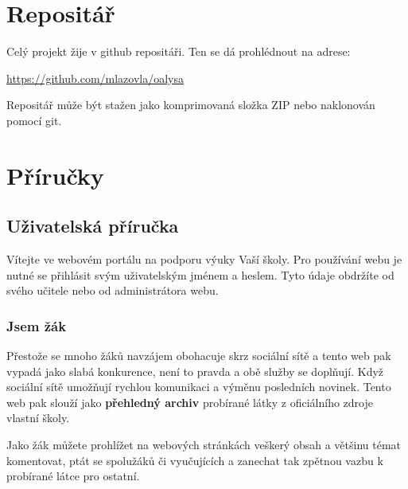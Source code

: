 \documentclass[thesis=B,czech]{FITthesis}[2012/06/26]
\begin{document}
\chapter{Repositář}


Celý projekt žije v github repositáři. Ten se dá prohlédnout na adrese:

\begin{center}
 \url{https://github.com/mlazovla/oalysa}
\end{center}
 
 Repositář může být stažen jako komprimovaná složka ZIP nebo naklonován pomocí git.

\begin{figure}
\end{figure}

\chapter{Příručky}

\section{Uživatelská příručka}

Vítejte ve webovém portálu na podporu výuky Vaší školy. Pro používání webu je nutné se přihlásit svým uživatelským jménem a heslem. Tyto údaje obdržíte od svého učitele nebo od administrátora webu.

\subsection{Jsem žák}

Přestože se mnoho žáků navzájem obohacuje skrz sociální sítě a tento web pak vypadá jako slabá konkurence, není to pravda a obě služby se doplňují. Když sociální sítě umožňují rychlou komunikaci a výměnu posledních novinek. Tento web pak slouží jako \textbf{přehledný archiv} probírané látky z oficiálního zdroje vlastní školy.

Jako žák můžete prohlížet na webových stránkách veškerý obsah a většinu témat komentovat, ptát se spolužáků či vyučujících a zanechat tak zpětnou vazbu k probírané látce pro ostatní.
\end{document}
